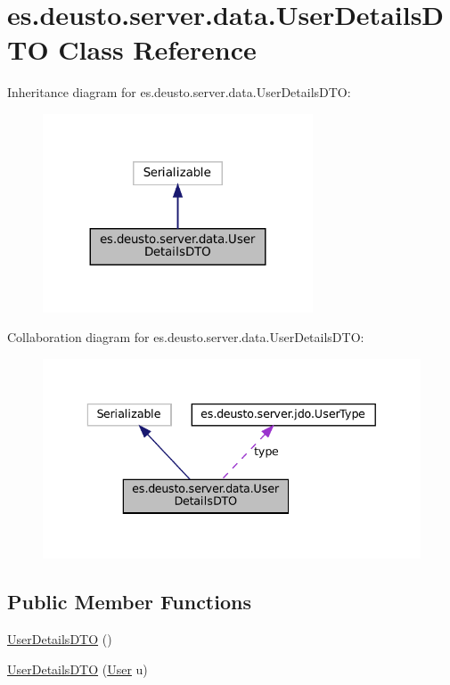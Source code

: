 \hypertarget{classes_1_1deusto_1_1server_1_1data_1_1_user_details_d_t_o}{}\section{es.\+deusto.\+server.\+data.\+User\+Details\+D\+TO Class Reference}
\label{classes_1_1deusto_1_1server_1_1data_1_1_user_details_d_t_o}


Inheritance diagram for es.\+deusto.\+server.\+data.\+User\+Details\+D\+TO\+:\nopagebreak
\begin{figure}[H]
\begin{center}
\leavevmode
\includegraphics[width=227pt]{classes_1_1deusto_1_1server_1_1data_1_1_user_details_d_t_o__inherit__graph}
\end{center}
\end{figure}


Collaboration diagram for es.\+deusto.\+server.\+data.\+User\+Details\+D\+TO\+:
\nopagebreak
\begin{figure}[H]
\begin{center}
\leavevmode
\includegraphics[width=336pt]{classes_1_1deusto_1_1server_1_1data_1_1_user_details_d_t_o__coll__graph}
\end{center}
\end{figure}
\subsection*{Public Member Functions}
\begin{DoxyCompactItemize}
\item 
\mbox{\hyperlink{classes_1_1deusto_1_1server_1_1data_1_1_user_details_d_t_o_ac079ed52a730b1c55f989bfd41f51ddb}{User\+Details\+D\+TO}} ()
\item 
\mbox{\hyperlink{classes_1_1deusto_1_1server_1_1data_1_1_user_details_d_t_o_aae05e33019f1da5126c95feda9f7d25a}{User\+Details\+D\+TO}} (\mbox{\hyperlink{classes_1_1deusto_1_1server_1_1jdo_1_1_user}{User}} u)
\end{DoxyCompactItemize}
